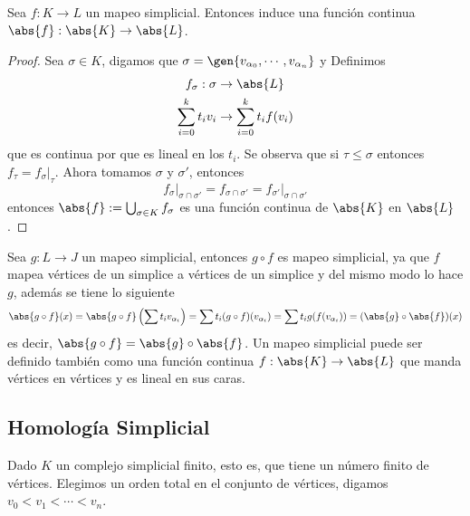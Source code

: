 \documentclass{article}
\begin{document}
\vspace{2mm}
\begin{lema}
    Sea $f:K\to L$ un mapeo simplicial. Entonces induce una función continua 
    $\abs{f}:\abs{K}\to\abs{L}$.
\end{lema}
\begin{proof}
    Sea $\sigma\in K$, digamos que $\sigma=\gen{v_{\alpha_{0}},\cdots,v_{\alpha_{n}}}$ y Definimos
    \begin{align*}
        f_{\sigma}:\sigma &\to \abs{L} \\
        \sum_{i=0}^{k}t_{i}v_{i} &\to \sum_{i=0}^{k}t_{i}f(v_{i})
    \end{align*}
    que es continua por que es lineal en los $t_{i}$. Se observa que si $\tau\leq\sigma$ entonces
    $f_{\tau}=f_{\sigma}\big|_{\tau}$. Ahora tomamos $\sigma$ y $\sigma'$, entonces
    \begin{equation*}
        f_{\sigma}\big|_{\sigma\cap\sigma'}=f_{\sigma\cap\sigma'}
        =f_{\sigma'}\big|_{\sigma\cap\sigma'}
    \end{equation*}
    entonces $\abs{f}:=\bigcup_{\sigma\in K}f_{\sigma}$ es una función continua de $\abs{K}$ en 
    $\abs{L}$.
\end{proof}
\noindent Sea $g:L\to J$ un mapeo simplicial, entonces $g\circ f$ es mapeo simplicial, ya que $f$
mapea vértices de un simplice a vértices de un simplice y del mismo modo lo hace $g$, además se 
tiene lo siguiente
\begin{equation*}
    \abs{g\circ f}(x)=\abs{g\circ f}\left(\sum t_{i}v_{\alpha_{i}}\right)
    =\sum t_{i}(g\circ f)(v_{\alpha_{i}})=\sum t_{i}g(f(v_{\alpha_{i}}))=(\abs{g}\circ\abs{f})(x)
\end{equation*}
es decir, $\abs{g\circ f}=\abs{g}\circ\abs{f}$. Un mapeo simplicial puede ser definido también 
como una función continua $f:\abs{K}\to\abs{L}$ que manda vértices en vértices y es lineal en sus 
caras.

\newpage
\subsection{Homología Simplicial}
\noindent Dado $K$ un complejo simplicial finito, esto es, que tiene un número finito de vértices. 
Elegimos un orden total en el conjunto de vértices, digamos $v_{0}<v_{1}<\cdots<v_{n}$.
\end{document}

